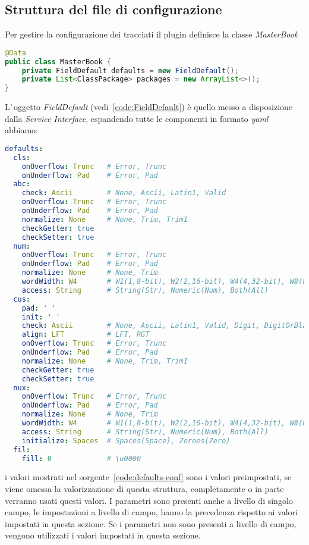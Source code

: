 \documentclass[a4paper,10pt]{report}
\begin{document}
\subsection{Struttura del file di configurazione}
Per gestire la configurazione dei tracciati il plugin definisce la classe
\textsl{MasterBook}

\begin{lstlisting}[language=java, caption=classe di configurazione MasterBook, 
label=code:MasterBook]
@Data
public class MasterBook {
    private FieldDefault defaults = new FieldDefault();
    private List<ClassPackage> packages = new ArrayList<>();
}
\end{lstlisting}

L'\,oggetto \textsl{FieldDefault} (vedi~\ref{code:FieldDefault}) è quello messo
a disposizione dalla \textsl{Service Interface}, espandendo tutte le componenti
in formato \textit{yaml} abbiamo:

\begin{lstlisting}[language=yaml, caption={configurazione, area default campi}, 
label=code:defaults-conf]
defaults:
  cls:
    onOverflow: Trunc   # Error, Trunc
    onUnderflow: Pad    # Error, Pad
  abc:
    check: Ascii        # None, Ascii, Latin1, Valid
    onOverflow: Trunc   # Error, Trunc
    onUnderflow: Pad    # Error, Pad
    normalize: None     # None, Trim, Trim1
    checkGetter: true
    checkSetter: true
  num:
    onOverflow: Trunc   # Error, Trunc
    onUnderflow: Pad    # Error, Pad
    normalize: None     # None, Trim
    wordWidth: W4       # W1(1,8-bit), W2(2,16-bit), W4(4,32-bit), W8(8,64-bit)
    access: String      # String(Str), Numeric(Num), Both(All)
  cus:
    pad: ' '
    init: ' '
    check: Ascii        # None, Ascii, Latin1, Valid, Digit, DigitOrBlank
    align: LFT          # LFT, RGT
    onOverflow: Trunc   # Error, Trunc
    onUnderflow: Pad    # Error, Pad
    normalize: None     # None, Trim, Trim1
    checkGetter: true
    checkSetter: true
  nux:
    onOverflow: Trunc   # Error, Trunc
    onUnderflow: Pad    # Error, Pad
    normalize: None     # None, Trim
    wordWidth: W4       # W1(1,8-bit), W2(2,16-bit), W4(4,32-bit), W8(8,64-bit)
    access: String      # String(Str), Numeric(Num), Both(All)
    initialize: Spaces  # Spaces(Space), Zeroes(Zero)
  fil:
    fill: 0             # \u0000

\end{lstlisting}
i valori mostrati nel sorgente~\ref{code:defaults-conf} sono i valori 
preimpostati, se viene omessa la valorizzazione di questa struttura, 
completamente o in parte verranno usati questi valori.
I parametri sono presenti anche a livello di singolo campo, le impostazioni a 
livello di campo, hanno la precedenza rispetto ai valori impostati in questa
sezione. Se i parametri non sono presenti a livello di campo, vengono utilizzati
i valori impostati in questa sezione.
\end{document}
